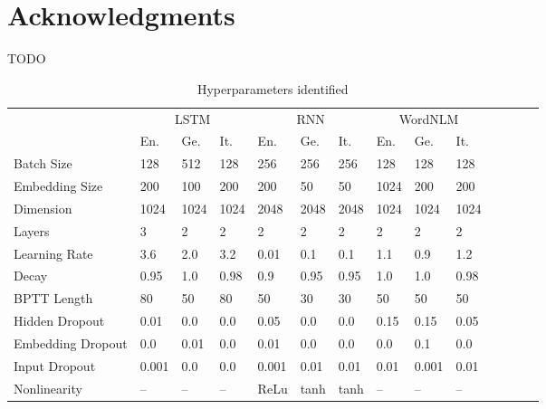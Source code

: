 










\section*{Acknowledgments} TODO








 \appendix

 \begin{table*}[t]
 	\begin{tabular}{l|lll|lll|lllllll}
 		&  \multicolumn{3}{c}{LSTM} & \multicolumn{3}{|c|}{RNN} & \multicolumn{3}{c}{WordNLM} \\
 		       &  En.     &  Ge.    & It.    & En.    &    Ge.   &  It.     &  En.     &   Ge.   &    It. \\  \hline
 	Batch Size     &  128   &  512  & 128  & 256  & 256    &  256   &  128   &   128 &  128   \\              
 	Embedding Size &  200   &  100  & 200  & 200  & 50     &  50    &  1024  &   200 &  200   \\             
 	Dimension      &  1024  &  1024 & 1024 & 2048 & 2048   &  2048  &  1024  &  1024 &  1024  \\  
 	Layers         &  3     &  2    & 2    & 2    & 2      &  2     &  2     &  2    &  2     \\   
 	Learning Rate  &  3.6   &  2.0  & 3.2  & 0.01 & 0.1    &  0.1   &  1.1   &  0.9  &  1.2   \\ 
 	Decay          &  0.95  &  1.0  & 0.98 & 0.9  & 0.95   &  0.95  &  1.0   &  1.0  &  0.98  \\
 	BPTT Length    &  80    &  50   & 80   & 50   & 30     &  30    &  50    &  50   &  50    \\
 	Hidden Dropout &  0.01  &  0.0  & 0.0  & 0.05 & 0.0    &  0.0   &  0.15  &  0.15 &  0.05  \\   
 	Embedding Dropout  & 0.0& 0.01  & 0.0  & 0.01 & 0.0    &  0.0   &  0.0   &  0.1  &  0.0   \\   
 	Input Dropout  & 0.001 &  0.0   & 0.0  & 0.001& 0.01   &  0.01  &  0.01  &  0.001&  0.01  \\ 
         Nonlinearity   &   --  & --     & --   & ReLu & tanh   &  tanh  &   --   &  --   &  --    \\                   
 \end{tabular}
 	\caption{Hyperparameters identified}
 \end{table*}






